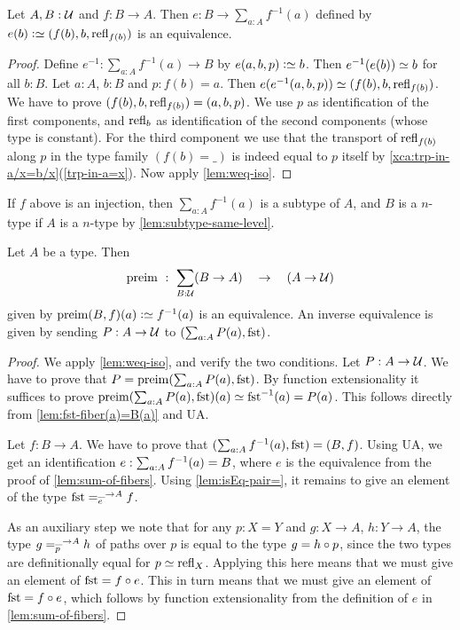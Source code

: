 \begin{definition}
\begin{lemma}\label{lem:sum-of-fibers}
Let $A,B:{\mathcal{U}}$ and $f:B\to A$. 
Then $e: B \to \sum_{a:A} f^{-1}(a)$ defined by
$e(b)\defeq (f(b),b,\refl{f(b)})$ is an equivalence.
\end{lemma}
\begin{proof}
Define $e^{-1}: \sum_{a:A} f^{-1}(a) \to B$ by $e(a,b,p)\defeq b$.
Then $e^{-1}(e(b))\jdeq b$ for all $b:B$.
Let $a:A$, $b:B$ and $p: f(b)=a$.
Then $e(e^{-1}(a,b,p))\jdeq (f(b),b,\refl{f(b)})$.
We have to prove $(f(b),b,\refl{f(b)})=(a,b,p)$.
We use $p$ as identification of the first components,
and $\refl{b}$ as identification of the second components
(whose type is constant). For the third component
we use that the transport of $\refl{f(b)}$ along $p$
in the type family $(f(b)=\_)$ is indeed equal to $p$
itself by \cref{xca:trp-in-a/x=b/x}(\ref{trp-in-a=x}).
Now apply \cref{lem:weq-iso}.
\end{proof}

If $f$ above is an injection, then $\sum_{a:A} f^{-1}(a)$ is a subtype of $A$,
and $B$ is a $n$-type if $A$ is a $n$-type by \cref{lem:subtype-same-level}.

\begin{lemma}\label{lem:typefamiliesandfibrations}
Let $A$ be a type. Then
\[
\preim ~:~ \sum_{B:\UU}(B\to A) \quad\to\quad (A\to\UU) 
\] 
given by $\preim(B,f)(a)\defeq f^{-1}(a)$ is an equivalence.
An inverse equivalence is given by sending $P:A\to{\mathcal{U}}$ to 
$(\sum_{a:A}P(a), \fst)$.
\end{lemma}

\begin{proof}
We apply \cref{lem:weq-iso}, and verify the two conditions.
Let $P:A\to{\mathcal{U}}$. We have to prove that $P = \preim(\sum_{a:A}P(a), \fst)$.
By function extensionality it suffices to prove
$\preim(\sum_{a:A}P(a), \fst)(a)\jdeq \fst^{-1}(a) = P(a)$.
This follows directly from \cref{lem:fst-fiber(a)=B(a)} and UA.

Let $f: B\to A$. We have to prove that $(\sum_{a:A} f^{-1}(a), \fst)=(B,f)$.
Using UA, we get an identification
${e} : \sum_{a:A} f^{-1}(a) = B$, where $e$ is the equivalence
from the proof of \cref{lem:sum-of-fibers}. Using \cref{lem:isEq-pair=},
it remains to give an element of the type $\pathover{\fst}{\_\to A}{\etop{e}}{f}$.

As an auxiliary step we note that for any $p: X=Y$ and $g:X\to A$,
$h:Y\to A$, the type $g =^{\_\to A}_{p} h$ of paths over $p$
is equal to the type $g = h\circ{{p}}$, since the two
types are definitionally equal for $p\jdeq\refl{X}$.
Applying this here means that we must give an element of
$\fst = f\circ{\ptoe{\etop{e}}}$. This in turn means that
we must give an element of $\fst = f\circ e$,
which follows by function extensionality from the definition 
of $e$ in \cref{lem:sum-of-fibers}.
\end{proof}


\end{definition}
